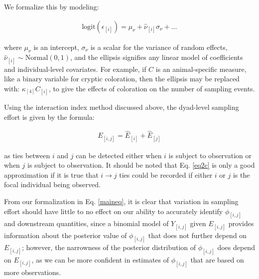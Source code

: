 \documentclass[Afour,sageh,times]{sagej}
\begin{document}
We formalize this by modeling:
\begin{ceqn}
\begin{align}\label{eq2b}
\text{logit}(\epsilon_{[i]}) = \mu_\nu + \hat\nu_{[i]} \sigma_\nu + \ldots 
\end{align}
\end{ceqn}
where $\mu_\nu$ is an intercept, $\sigma_\nu$ is a scalar for the variance of random effects, $\hat\nu_{[i]}\sim \text {Normal}(0,1)$, and the ellipsis signifies any linear model of coefficients and individual-level covariates. For example, if $C$ is an animal-specific measure, like a binary variable for cryptic coloration, then the ellipsis may be replaced with:  $\kappa_{[4]}C_{[i]}$, to give the effects of coloration on the number of sampling events. 

Using the interaction index method discussed above, the dyad-level sampling effort is given by the formula:
\begin{ceqn}
\begin{align}\label{eq2c}
E_{[i,j]} = \hat E_{[i]} + \hat E_{[j]} 
\end{align}
\end{ceqn}
as ties between $i$ and $j$ can be detected either when $i$ is subject to observation or when $j$ is subject to observation. It should be noted that Eq. \ref{eq2c} is only a good approximation if it is true that $i\to j$ ties could be recorded if either $i$ or $j$ is the focal individual being observed. %

From our formalization in Eq. \ref{maineq}, it is clear that variation in sampling effort should have little to no effect on our ability to accurately identify $\phi_{[i,j]}$ and downstream quantities, since a binomial model of $Y_{[i,j]}$ given $E_{[i,j]}$ provides information about the posterior value of $\phi_{[i,j]}$ that does not further depend on $E_{[i,j]}$; however, the narrowness of the posterior distribution of $\phi_{[i,j]}$ does depend on $E_{[i,j]}$, as we can be more confident in estimates of $\phi_{[i,j]}$ that are based on more observations.
\end{document}
